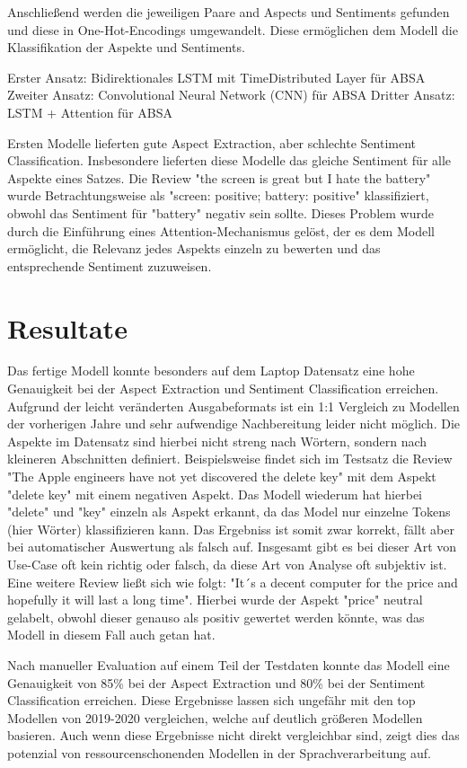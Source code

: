 \documentclass[12pt]{article}
\begin{document}
Anschließend werden die jeweiligen Paare and Aspects und Sentiments gefunden und diese in One-Hot-Encodings umgewandelt. Diese ermöglichen dem Modell die Klassifikation der Aspekte und Sentiments.


Erster Ansatz: Bidirektionales LSTM mit TimeDistributed Layer für ABSA
Zweiter Ansatz: Convolutional Neural Network (CNN) für ABSA
Dritter Ansatz: LSTM + Attention für ABSA

Ersten Modelle lieferten gute Aspect Extraction, aber schlechte Sentiment Classification. Insbesondere lieferten diese Modelle das gleiche Sentiment 
für alle Aspekte eines Satzes. Die Review "the screen is great but I hate the battery" wurde Betrachtungsweise als "screen: positive; battery: positive" 
klassifiziert, obwohl das Sentiment für "battery" negativ sein sollte. Dieses Problem wurde durch die Einführung eines Attention-Mechanismus gelöst, 
der es dem Modell ermöglicht, die Relevanz jedes Aspekts einzeln zu bewerten und das entsprechende Sentiment zuzuweisen.

\section{Resultate}

Das fertige Modell konnte besonders auf dem Laptop Datensatz eine hohe Genauigkeit bei der Aspect Extraction und Sentiment Classification erreichen. Aufgrund der leicht veränderten Ausgabeformats ist ein 1:1 Vergleich zu Modellen der vorherigen Jahre und sehr aufwendige Nachbereitung leider nicht möglich. Die Aspekte im Datensatz sind hierbei nicht streng nach Wörtern, sondern nach kleineren Abschnitten definiert. Beispielsweise findet sich im Testsatz die Review "The Apple engineers have not yet discovered the delete key" mit dem Aspekt "delete key" mit einem negativen Aspekt. Das Modell wiederum hat hierbei "delete" und "key" einzeln als Aspekt erkannt, da das Model nur einzelne Tokens (hier Wörter) klassifizieren kann. Das Ergebniss ist somit zwar korrekt, fällt aber bei automatischer Auswertung als falsch auf.
Insgesamt gibt es bei dieser Art von Use-Case oft kein richtig oder falsch, da diese Art von Analyse oft subjektiv ist. Eine weitere Review ließt sich wie folgt: "It´s a decent computer for the price and hopefully it will last a long time". Hierbei wurde der Aspekt "price" neutral gelabelt, obwohl dieser genauso als positiv gewertet werden könnte, was das Modell in diesem Fall auch getan hat.

Nach manueller Evaluation auf einem Teil der Testdaten konnte das Modell eine Genauigkeit von 85\% bei der Aspect Extraction und 80\% bei der Sentiment Classification erreichen. Diese Ergebnisse lassen sich ungefähr mit den top Modellen von 2019-2020 vergleichen, welche auf deutlich größeren Modellen basieren. Auch wenn diese Ergebnisse nicht direkt vergleichbar sind, zeigt dies das potenzial von ressourcenschonenden Modellen in der Sprachverarbeitung auf.
\end{document}
